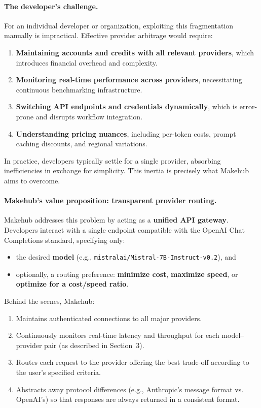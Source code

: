 \documentclass[english]{article}
\begin{document}
\paragraph{The developer's challenge.}

For an individual developer or organization, exploiting this fragmentation manually is impractical. Effective provider arbitrage would require:
\begin{enumerate}
    \item \textbf{Maintaining accounts and credits with all relevant providers}, which introduces financial overhead and complexity.
    \item \textbf{Monitoring real-time performance across providers}, necessitating continuous benchmarking infrastructure.
    \item \textbf{Switching API endpoints and credentials dynamically}, which is error-prone and disrupts workflow integration.
    \item \textbf{Understanding pricing nuances}, including per-token costs, prompt caching discounts, and regional variations.
\end{enumerate}

In practice, developers typically settle for a single provider, absorbing inefficiencies in exchange for simplicity. This inertia is precisely what Makehub aims to overcome.

\paragraph{Makehub's value proposition: transparent provider routing.}

Makehub addresses this problem by acting as a \textbf{unified API gateway}. Developers interact with a single endpoint compatible with the OpenAI Chat Completions standard, specifying only:
\begin{itemize}
    \item the desired \textbf{model} (e.g., \texttt{mistralai/Mistral-7B-Instruct-v0.2}), and
    \item optionally, a routing preference: \textbf{minimize cost}, \textbf{maximize speed}, or \textbf{optimize for a cost/speed ratio}.
\end{itemize}

Behind the scenes, Makehub:
\begin{enumerate}
    \item Maintains authenticated connections to all major providers.
    \item Continuously monitors real-time latency and throughput for each model–provider pair (as described in Section~3).
    \item Routes each request to the provider offering the best trade-off according to the user's specified criteria.
    \item Abstracts away protocol differences (e.g., Anthropic's message format vs. OpenAI's) so that responses are always returned in a consistent format.
\end{enumerate}
\end{document}
